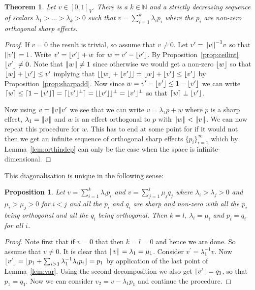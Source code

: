 \documentclass[b5paper,onecolumn,12pt,accepted=2019-05-03, issue=1, volume=1, shorttitle=papers/compositionality-1-1]{compositionalityarticle}
\DeclarePairedDelimiter{\ceil}{\lceil}{\rceil}
\DeclarePairedDelimiter{\floor}{\lfloor}{\rfloor}
\newcounter{counter}
\numberwithin{counter}{section}
\newtheorem{theorem}[counter]{Theorem}
\newtheorem{proposition}[counter]{Proposition}
\newcommand{\N}{\mathbb{N}}
\begin{document}
\begin{theorem}\label{theor:diag}
	Let $v\in[0,1]_V$. There is a $k\in \N$ and a strictly decreasing sequence of scalars $\lambda_1>\ldots>\lambda_k>0$ such that $v=\sum_{i=1}^k \lambda_i p_i$ where the $p_i$ are non-zero orthogonal sharp effects.
\end{theorem}
\begin{proof}
If $v=0$ the result is trivial, so assume that $v\neq 0$. 
Let $v^\prime = \norm{v}^{-1} v$ so that $\norm{v^\prime} = 1$. Write $v^\prime = \floor{v^\prime} + w$ for $w=v^\prime - \floor{v^\prime}$. By Proposition~\ref{prop:ceilint} $\floor{v^\prime} \neq 0$. 
Note that $\norm{w}\neq 1$ since otherwise we would get a non-zero $\floor{w}$ so that $\floor{w}+\floor{v^\prime}\leq v^\prime$ implying that $\floor{\floor{w}+\floor{v^\prime}} = \floor{w}+\floor{v^\prime}\leq \floor{v^\prime}$ by Proposition~\ref{prop:sharpadd}. 
Now since $w=v^\prime-\floor{v^\prime}\leq 1 - \floor{v^\prime}$ we can write $\ceil{w}\leq \ceil{1-\floor{v^\prime}} = \ceil{\floor{v^\prime}^\perp} = \floor{\floor{v^\prime}}^\perp = \floor{v^\prime}^\perp$ so that $\ceil{w} \perp \floor{v^\prime}$.

Now using $v = \norm{v}v^\prime$ we see that we can write $v = \lambda_1 p + w$ where $p$ is a sharp effect, $\lambda_1 = \norm{v}$ and $w$ is an effect orthogonal to $p$ with $\norm{w}<\norm{v}$. We can now repeat this procedure for $w$. This has to end at some point for if it would not then we get an infinite sequence of orthogonal sharp effects $\{p_i\}_{i=1}^\infty$ which by Lemma~\ref{lem:orthindep} can only be the case when the space is infinite-dimensional.
\end{proof}

\noindent This diagonalisation is unique in the following sense:

\begin{proposition}
	Let $v = \sum_{i=1}^k \lambda_i p_i$ and $v=\sum_{j=1}^l \mu_j q_j$ where $\lambda_i>\lambda_j>0$ and $\mu_i>\mu_j>0$ for $i<j$ and all the $p_i$ and $q_i$ are sharp and non-zero with all the $p_i$ being orthogonal and all the $q_i$ being orthogonal. Then $k=l$, $\lambda_i=\mu_i$ and $p_i=q_i$ for all $i$.
\end{proposition}
\begin{proof}
	Note first that if $v=0$ that then $k=l=0$ and hence we are done. So assume that $v\neq 0$. It is clear that $\norm{v}=\lambda_1=\mu_1$. Consider $v^\prime = \lambda_1^{-1}v$. Now $\floor{v^\prime}=\floor{p_1 + \sum_{i>1}\lambda_1^{-1}\lambda_i p_i} = p_1$ by application of the last point of Lemma~\ref{lem:var}. Using the second decomposition we also get $\floor{v^\prime} = q_1$, so that $p_1=q_1$. Now we can consider $v_2 = v-\lambda_1p_1$ and continue the procedure.
\end{proof}
\end{document}
